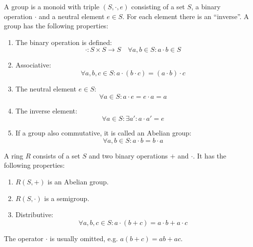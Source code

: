 \begin{definition}[Group]
    A group is a monoid with triple $(S, \cdot, e)$ consisting of a set $S$, 
    a binary operation $\cdot$ and a neutral element $e \in S$.
    For each element there is an ``inverse''.
    A group has the following properties:
    \begin{enumerate}
        \item The binary operation is defined:
            \begin{equation}
                \cdot: S \times S \rightarrow S \quad \forall a,b \in S: a \cdot b \in S
            \end{equation}
        \item Associative:
            \begin{equation}
                \forall a,b,c \in S: a \cdot (b \cdot c) = (a \cdot b) \cdot c
            \end{equation} 
        \item The neutral element $e \in S$:
            \begin{equation}
                \forall a \in S: a \cdot e = e \cdot a = a
            \end{equation}
        \item The inverse element:
            \begin{equation}
                \forall a \in S: \exists a': a \cdot a' = e
            \end{equation}
        \item If a group also commutative, it is called an Abelian group:
        \begin{equation}
            \forall a,b \in S: a \cdot b = b \cdot a
        \end{equation}
    \end{enumerate}
\end{definition}

\begin{definition}[Ring]
    A ring $R$ consists of a set $S$ and two binary operations $+$ and $\cdot$.
    It has the following properties:
    \begin{enumerate}
        \item $R(S,+)$ is an Abelian group.
        \item $R(S,\cdot)$ is a semigroup.
        \item Distributive:
            \begin{equation}
                \forall a,b,c \in S: a \cdot (b + c) = a \cdot b + a \cdot c
            \end{equation}
    \end{enumerate}
    The operator $\cdot$ is usually omitted, e.g. $a (b + c) = ab + ac$.
\end{definition}

